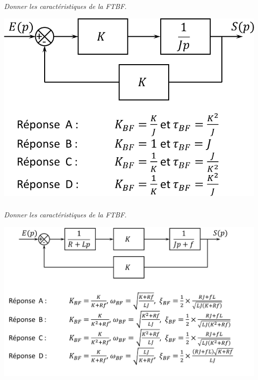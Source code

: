 \documentclass[10pt,fleqn]{article} %
\begin{document}

\vspace{4.5cm}
\pagestyle{fancy}
\thispagestyle{plain}

\def\columnseprulecolor{\color{ocre}}
\setlength{\columnseprule}{0.4pt} 


\begin{multicols}{2}

\subparagraph{}\textit{Donner les caractéristiques de la FTBF.}
\begin{center}
\includegraphics[width=\linewidth]{01}
\end{center}

\subparagraph{}\textit{Donner les caractéristiques de la FTBF.}
\begin{center}
\includegraphics[width=\linewidth]{02}
\end{center}


\end{multicols}
\end{document}
